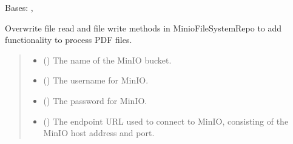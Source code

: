 \documentclass[letterpaper,10pt,english]{sphinxmanual}
\begin{document}
\begin{fulllineitems}
\label{\detokenize{src.database:src.database.minio.MinioFileSystem}}
\pysigstartsignatures
\pysiglinewithargsret
{}
{\sphinxparamcomma {}\sphinxparamcomma {}\sphinxparamcomma {}\sphinxparamcomma {}}
{}
\pysigstopsignatures
\sphinxAtStartPar
Bases: , 

\sphinxAtStartPar
Overwrite file read and file write methods in MinioFileSystemRepo to add functionality to process PDF files.
\begin{quote}\begin{description}
\begin{itemize}
\item {} 
\sphinxAtStartPar
{} () \textendash{} The name of the MinIO bucket.

\item {} 
\sphinxAtStartPar
{} () \textendash{} The username for MinIO.

\item {} 
\sphinxAtStartPar
{} () \textendash{} The password for MinIO.

\item {} 
\sphinxAtStartPar
{} () \textendash{} The endpoint URL used to connect to MinIO, consisting of the MinIO host address and port.


\end{itemize}
\end{description}
\end{quote}
\end{fulllineitems}
\end{document}
